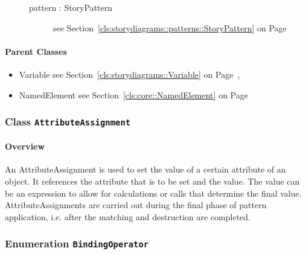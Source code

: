 \begin{description}
\begin{description}
	
\item[pattern : StoryPattern 	]
see Section~\ref{cls:storydiagrams::patterns::StoryPattern} on Page~\pageref{cls:storydiagrams::patterns::StoryPattern}
\hspace{\fill}
\nopagebreak


	
	\end{description}
	

\end{description}

\paragraph{Parent Classes}
\begin{itemize}
\item Variable see Section~\ref{cls:storydiagrams::Variable} on Page~\pageref{cls:storydiagrams::Variable}, \item NamedElement see Section~\ref{cls:core::NamedElement} on Page~\pageref{cls:core::NamedElement}\end{itemize}
\subsubsection{\Large{Class \bfseries \texttt{AttributeAssignment}\normalfont}}
\label{cls:storydiagrams::patterns::AttributeAssignment} 
\paragraph{Overview}

	
			
An AttributeAssignment is used to set the value of a certain attribute of an object. It references the attribute that is to be set and the value. The value can be an expression to allow for calculations or calls that determine the final value. AttributeAssignments are carried out during the final phase of pattern application, i.e. after the matching and destruction are completed.	
		
	



\subsubsection{\Large{Enumeration \bfseries \texttt{BindingOperator}\normalfont}}
\label{cls:storydiagrams::patterns::BindingOperator} 
